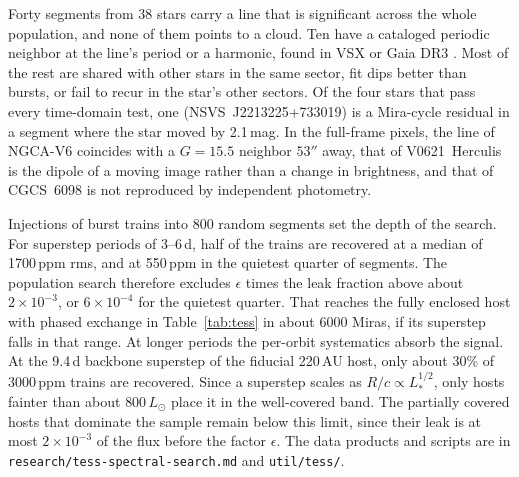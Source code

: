 \documentclass[final,5p]{elsarticle}
\newcommand{\Lsun}{L_\odot}
\begin{document}
Forty segments from 38 stars carry a line that is significant across the whole population, and none of them points to a cloud. Ten have a cataloged periodic neighbor at the line's period or a harmonic, found in VSX or Gaia DR3 \citep{Vallenari2023}. Most of the rest are shared with other stars in the same sector, fit dips better than bursts, or fail to recur in the star's other sectors. Of the four stars that pass every time-domain test, one (NSVS~J2213225+733019) is a Mira-cycle residual in a segment where the star moved by 2.1\,mag. In the full-frame pixels, the line of NGCA-V6 coincides with a $G=15.5$ neighbor $53''$ away, that of V0621~Herculis is the dipole of a moving image rather than a change in brightness, and that of CGCS~6098 is not reproduced by independent photometry.

Injections of burst trains into 800 random segments set the depth of the search. For superstep periods of 3--6\,d, half of the trains are recovered at a median of 1700\,ppm rms, and at 550\,ppm in the quietest quarter of segments. The population search therefore excludes $\epsilon$ times the leak fraction above about $2\times10^{-3}$, or $6\times10^{-4}$ for the quietest quarter. That reaches the fully enclosed host with phased exchange in Table~\ref{tab:tess} in about 6000 Miras, if its superstep falls in that range. At longer periods the per-orbit systematics absorb the signal. At the 9.4\,d backbone superstep of the fiducial 220\,AU host, only about 30\% of 3000\,ppm trains are recovered. Since a superstep scales as $R/c\propto L_\ast^{1/2}$, only hosts fainter than about $800\,\Lsun$ place it in the well-covered band. The partially covered hosts that dominate the sample remain below this limit, since their leak is at most $2\times10^{-3}$ of the flux before the factor $\epsilon$. The data products and scripts are in \texttt{research/tess-spectral-search.md} and \texttt{util/tess/}.
\end{document}
